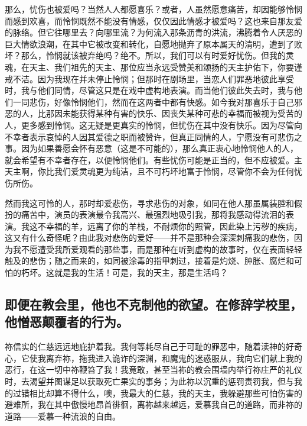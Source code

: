 那么，忧伤也被爱吗？当然人人都愿喜乐？或者，人虽然愿意痛苦，却因能够怜悯而感到欢喜，而怜悯既然不能没有情感，仅仅因此情感才被爱吗？这也来自那友爱的脉络。但它往哪里去？向哪里流？为何流入那条沥青的洪流，沸腾着令人厌恶的巨大情欲浪潮，在其中它被改变和转化，自愿地抛弃了原本属天的清明，遭到了败坏？那么，怜悯就该被弃绝吗？绝不。所以，我们可以有时爱好忧伤。但我的灵魂，在天主、我们祖先的天主、那位应当永远受赞美和颂扬的天主护佑下，你要谨戒不洁。因为我现在并未停止怜悯；但那时在剧场里，当恋人们罪恶地彼此享受时，我与他们同情，尽管这只是在戏中虚构地表演。而当他们彼此失去时，我与他们一同悲伤，好像怜悯他们，然而在这两者中都有快感。如今我对那喜乐于自己邪恶的人，比那因未能获得某种有害的快乐、因丧失某种可悲的幸福而被视为受苦的人，更多感到怜悯。这无疑是更真实的怜悯，但忧伤在其中没有快乐。因为尽管向不幸者表示哀悼的人因其爱德之职而被赞许，但真正同情的人，宁愿没有可悲伤之事。因为如果善愿会怀有恶意（这是不可能的），那么真正衷心地怜悯他人的人，就会希望有不幸者存在，以便怜悯他们。有些忧伤可能是正当的，但不应被爱。主天主啊，你比我们爱灵魂更为纯洁，且不可朽坏地富于怜悯，尽管你不会为任何忧伤所伤。 \par

然而我这可怜的人，那时却爱悲伤，寻求悲伤的对象，如同在他人那虽属装腔和假扮的痛苦中，演员的表演最令我高兴、最强烈地吸引我，那将我感动得流泪的表演。我这不幸福的羊，远离了你的羊栈，不耐烦你的照管，因此染上污秽的疾病，这又有什么奇怪呢？由此我对悲伤的爱好——并不是那种会深深刺痛我的悲伤，因为我不愿遭受我所爱观看的那些事，而是那种在听到虚构的故事时，仅在表面轻轻触及的悲伤；随之而来的，如同被涂毒的指甲刺过，接着是灼烧、肿胀、腐烂和可怕的朽坏。这就是我的生活！可是，我的天主，那是生活吗？\par


\subsection{即便在教会里，他也不克制他的欲望。在修辞学校里，他憎恶颠覆者的行为。}

祢信实的仁慈远远地庇护着我。我何等耗尽自己于可耻的罪恶中，随着渎神的好奇心，它使我离弃祢，拖我进入诡诈的深渊，和魔鬼的迷惑服从，我向它们献上我的恶行，在这一切中祢鞭笞了我！我竟敢，甚至当祢的教会围墙内举行祢庄严的礼仪时，去渴望并图谋足以获取死亡果实的事务；为此祢以沉重的惩罚责罚我，但与我的过错相比却算不得什么，噢，我最大的仁慈，我的天主，我躲避那些可怕伤害的避难所，我在其中傲慢地昂首徘徊，离祢越来越远，爱慕我自己的道路，而非祢的道路——爱慕一种流浪的自由。\par

